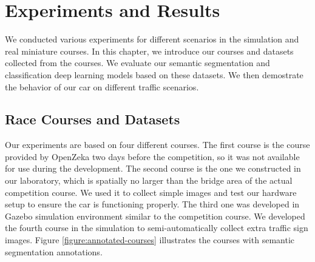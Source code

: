 \chapter{Experiments and Results}
\label{chp:b6}

We conducted various experiments for different scenarios in the simulation and
real miniature courses. In this chapter, we introduce our courses and datasets
collected from the courses. We evaluate our semantic segmentation and
classification deep learning models based on these datasets. We then demostrate
the behavior of our car on different traffic scenarios.

\section{Race Courses and Datasets}

Our experiments are based on four different courses. The first course is the
course provided by OpenZeka  two days before the competition, so it was not
available for use during the development. The second course is the one we
constructed in our laboratory, which is spatially no larger than the bridge
area of the actual competition course. We used it to collect simple images and
test our hardware setup to ensure the car is functioning properly. The third
one was developed in Gazebo simulation environment similar to the competition
course. We developed the fourth course in the simulation to semi-automatically
collect extra traffic sign images. Figure \ref{figure:annotated-courses}
illustrates the courses with semantic segmentation annotations.

